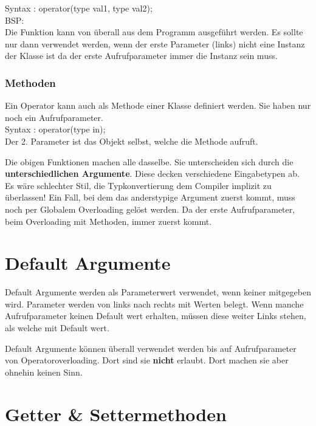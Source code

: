 Syntax :  operator(type val1, type val2);\\
BSP:\\



Die Funktion kann von überall aus dem Programm ausgeführt werden. 
Es sollte nur dann verwendet werden, wenn der erste Parameter (links) nicht eine Instanz der Klasse ist da der erste Aufrufparameter immer die Instanz sein muss.  

\subsubsection{Methoden}

Ein Operator kann auch als Methode einer Klasse definiert werden. 
Sie haben nur noch ein Aufrufparameter.\\
Syntax :  operator(type in);\\
Der 2. Parameter ist das Objekt selbst, welche die Methode aufruft.



Die obigen Funktionen machen alle dasselbe. 
Sie unterscheiden sich durch die \textbf{unterschiedlichen Argumente}. 
Diese decken verschiedene Eingabetypen ab. 
Es wäre schlechter Stil, die Typkonvertierung dem Compiler implizit zu überlassen! 
Ein Fall, bei dem das anderstypige Argument zuerst kommt, muss noch per Globalem Overloading gelöst werden. 
Da der erste Aufrufparameter, beim Overloading mit Methoden, immer zuerst kommt. 
 
\section{Default Argumente}

Default Argumente werden als Parameterwert verwendet, wenn keiner mitgegeben wird.
Parameter werden von links nach rechts mit Werten belegt. 
Wenn manche Aufrufparameter keinen Default wert erhalten, müssen diese weiter Links stehen, als welche mit Default wert.  



Default Argumente können überall verwendet werden bis auf Aufrufparameter von Operatoroverloading. 
Dort sind sie \textbf{nicht} erlaubt. 
Dort machen sie aber ohnehin keinen Sinn. 

\section{Getter \& Settermethoden}

